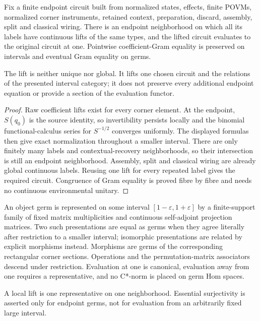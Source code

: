 \begin{theorem}
{\normalfont\statusProved}\quad
Fix a finite endpoint circuit built from normalized states, effects, finite
POVMs, normalized corner instruments, retained context, preparation,
discard, assembly, split and classical wiring.  There is an endpoint
neighborhood on which all its labels have continuous lifts of the same types,
and the lifted circuit evaluates to the original circuit at one.  Pointwise
coefficient-Gram equality is preserved on intervals and eventual Gram
equality on germs.
\end{theorem}
\begin{scope}
The lift is neither unique nor global.  It lifts one chosen circuit and the
relations of the presented interval category; it does not preserve every
additional endpoint equation or provide a section of the evaluation functor.
\end{scope}
\begin{proof}
Raw coefficient lifts exist for every corner element.  At the endpoint,
$S(q_0)$ is the source identity, so invertibility persists locally and the
binomial functional-calculus series for $S^{-1/2}$ converges uniformly.
The displayed formulas then give exact normalization throughout a smaller
interval.  There are only finitely many labels and contextual-recovery
neighborhoods, so their intersection is still an endpoint neighborhood.
Assembly, split and classical wiring are already global continuous labels.
Reusing one lift for every repeated label gives the required circuit.
Congruence of Gram equality is proved fibre by fibre and needs no continuous
environmental unitary.
\end{proof}

\begin{definition}
An object germ is represented on some interval
$[1-\varepsilon,1+\varepsilon]$ by a finite-support family of fixed matrix
multiplicities and continuous self-adjoint projection matrices.  Two such
presentations are equal as germs when they agree literally after restriction
to a smaller interval; isomorphic presentations are related by explicit
morphisms instead.  Morphisms are germs of the corresponding rectangular
corner sections.  Operations and the permutation-matrix associators descend
under restriction.  Evaluation at one is canonical, evaluation away from one
requires a representative, and no C*-norm is placed on germ Hom spaces.
\end{definition}
\begin{scope}
A local lift is one representative on one neighborhood.  Essential
surjectivity is asserted only for endpoint germs, not for evaluation from an
arbitrarily fixed large interval.
\end{scope}

